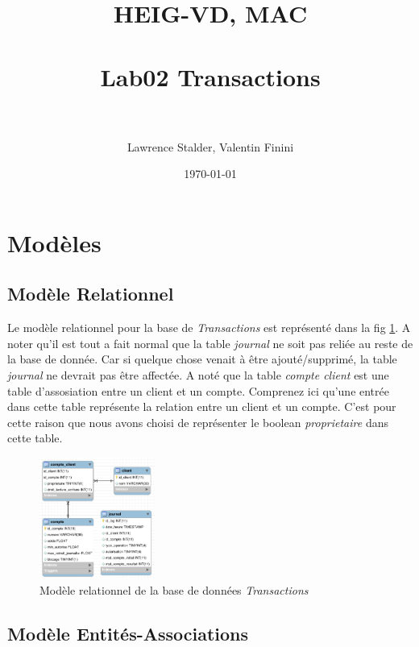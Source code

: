 \documentclass[paper=a4, fontsize=11pt]{scrartcl} %
\title{	
\normalfont \normalsize 
\textsc{HEIG-VD, MAC} \\ [25pt] %
\horrule{0.5pt} \\[0.4cm] %
\huge Lab02 Transactions \\ %
\horrule{2pt} \\[0.5cm] %
}
\author{Lawrence Stalder, Valentin Finini} %
\date{\normalsize\today} %
\numberwithin{equation}{section} %
\numberwithin{figure}{section} %
\numberwithin{table}{section} %
\begin{document}
\maketitle %


\section{Modèles}

\subsection{Modèle Relationnel}

Le modèle relationnel pour la base de \textit{Transactions} est représenté dans la fig \ref{fig:rela}. A noter qu'il est tout a fait normal que la table \textit{journal} ne soit pas reliée au reste de la base de donnée. Car si quelque chose venait à être ajouté/supprimé, la table \textit{journal} ne devrait pas être affectée. A noté que la table \textit{compte client} est une table d'assosiation entre un client et un compte. Comprenez ici qu'une entrée dans cette table représente la relation entre un client et un compte. C'est pour cette raison que nous avons choisi de représenter le boolean \textit{proprietaire} dans cette table. 

\begin{figure}[h!]
  \centering
  \includegraphics[height=150px]{relationnel.png}
  \caption{Modèle relationnel de la base de données \textit{Transactions}}
  \label{fig:rela}
\end{figure}


\subsection{Modèle Entités-Associations}
\end{document}
